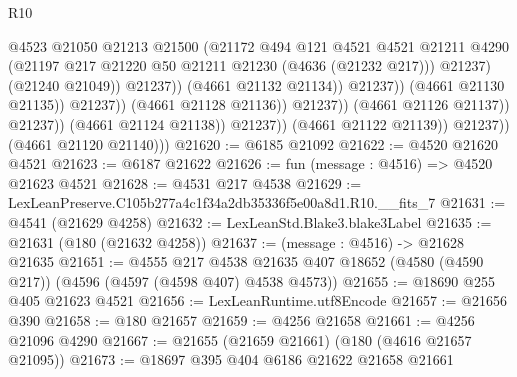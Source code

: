 \begin{lexlean}{R10}
\begin{coremodule}
                                                  @4523
                                                  @21050
                                                  @21213
                                                  @21500
                                                  (@21172
                                                    @494
                                                    @121
                                                    @4521
                                                    @4521
                                                    @21211
                                                    @4290
                                                    (@21197
                                                      @217
                                                      @21220
                                                      @50
                                                      @21211
                                                      @21230
                                                      (@4636 (@21232 @217)))
                                                    @21237)
                                                  (@21240 @21049))
                                                @21237))
                                            (@4661 @21132 @21134))
                                          @21237))
                                      (@4661 @21130 @21135))
                                    @21237))
                                (@4661 @21128 @21136))
                              @21237))
                          (@4661 @21126 @21137))
                        @21237))
                    (@4661 @21124 @21138))
                  @21237))
              (@4661 @21122 @21139))
            @21237))
        (@4661 @21120 @21140)))
@21620 := @6185 @21092
@21622 := @4520 @21620 @4521
@21623 := @6187 @21622
@21626 := fun (message : @4516) => @4520 @21623 @4521
@21628 := @4531 @217 @4538
@21629 := LexLeanPreserve.C105b277a4c1f34a2db35336f5e00a8d1.R10.__fits_7
@21631 := @4541 (@21629 @4258)
@21632 := LexLeanStd.Blake3.blake3Label
@21635 := @21631 (@180 (@21632 @4258))
@21637 := (message : @4516) -> @21628 @21635
@21651 := @4555
    @217
    @4538
    @21635
    @407
    @18652
    (@4580 (@4590 @217))
    (@4596 (@4597 (@4598 @407) @4538 @4573))
@21655 := @18690 @255 @405 @21623 @4521
@21656 := LexLeanRuntime.utf8Encode
@21657 := @21656 @390
@21658 := @180 @21657
@21659 := @4256 @21658
@21661 := @4256 @21096 @4290
@21667 := @21655 (@21659 @21661) (@180 (@4616 @21657 @21095))
@21673 := @18697 @395 @404 @6186 @21622 @21658 @21661

\end{coremodule}
\end{lexlean}
